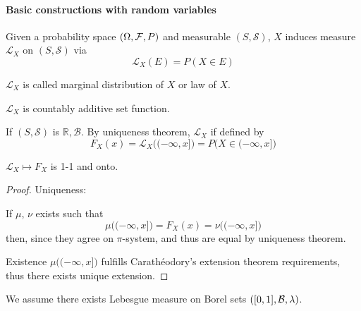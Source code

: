 \paragraph{Basic constructions with random variables}
\begin{definition}
	Given a probability space $\qty(\Omega, \mathcal{F}, P)$  and measurable $ (S, \mathcal{S})$, $X$ induces measure $\mathcal{L}_X$ on $ (S, \mathcal{S})$ via
	$$\mathcal{L}_X(E) = P(X \in E)$$

$\mathcal{L}_X$ is called marginal distribution of $X$ or law of $X$.
\end{definition}
\begin{prop}
	$\mathcal{L}_X$ is countably additive set function.
\end{prop}

If $ (S, \mathcal{S})$ is $\mathbb{R}, \mathcal{B}$. By uniqueness theorem, $\mathcal{L}_X$ if defined by
$$F_X(x) = \mathcal{L}_X\big((-\infty, x]\big) = P\big(X\in (-\infty, x]\big)$$ 

\begin{prop}
	$\mathcal{L}_X \mapsto F_X$ is 1-1 and onto.
	\begin{proof}
		Uniqueness:
		
		If $\mu$, $\nu$ exists such that $$\mu\big((-\infty, x]\big) = F_X(x) = \nu\big((-\infty, x]\big)$$
		then, since they agree on $\pi$-system, and thus are equal by uniqueness theorem.
		
		Existence
		$\mu\big((-\infty, x]\big)$ fulfills Carath\'{e}odory's extension theorem requirements, thus there exists unique extension.
	\end{proof}
\end{prop}

We assume there exists Lebesgue measure on Borel sets $\qty([0,1], \mathcal{B}, \lambda)$.

